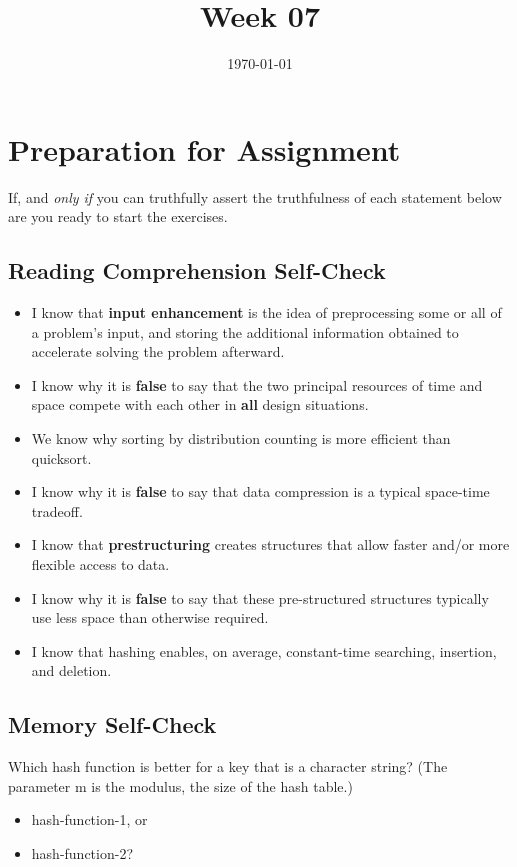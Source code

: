 \documentclass[12pt]{amsart}
\title{Week 07}
\date{\today}
\begin{document}
\maketitle

\section{Preparation for Assignment}
If, and \textit{only if} you can truthfully assert the truthfulness of each statement below are you ready to start the exercises.
\subsection {Reading Comprehension Self-Check}
\begin{itemize}
\item I know that \textbf{input enhancement} is the idea of preprocessing some or all of a problem\textquoteright s input, and storing the additional information obtained to accelerate solving the problem afterward.
 \item I know why it is \textbf{false} to say that the two principal resources of
    time and space compete with each other in \textbf{all} design situations.
 \item We know why sorting by distribution counting is more efficient than
    quicksort.
 \item I know why it is \textbf{false} to say that data compression is a typical
    space-time tradeoff.
 \item I know that \textbf{prestructuring} creates structures that allow faster
    and/or more flexible access to data.
 \item I know why it is \textbf{false} to say that these pre-structured structures
    typically use less space than otherwise required.
 \item I know that hashing enables, on average, constant-time searching,
    insertion, and deletion.

\end{itemize}
\subsection{Memory Self-Check}
Which hash function is better for a key that is a character string? (The
  parameter m is the modulus, the size of the hash table.)
\begin{itemize}
	\item hash-function-1, or
	\item hash-function-2?
\end{itemize}
\end{document}
